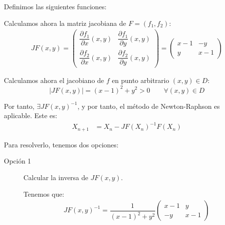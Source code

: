 \begin{ejercicio}
\begin{enumerate}
        Definimos las siguientes funciones:

        Calculamos ahora la matriz jacobiana de $F=(f_1,f_2)$:
        \begin{align*}
            JF(x,y)=\begin{pmatrix}
                \dfrac{\partial f_1}{\partial x}(x,y) & \dfrac{\partial f_1}{\partial y}(x,y)\\
                \dfrac{\partial f_2}{\partial x}(x,y) & \dfrac{\partial f_2}{\partial y}(x,y)
            \end{pmatrix}=\begin{pmatrix}
                x-1 & -y\\
                y & x-1
            \end{pmatrix}
        \end{align*}

        Calculamos ahora el jacobiano de $f$ en punto arbitrario $(x,y)\in D$:
        \begin{equation*}
            |JF(x,y)|=(x-1)^2+y^2>0\qquad \forall (x,y)\in D
        \end{equation*}

        Por tanto, $\exists JF(x,y)^{-1}$, y por tanto, el método de Newton-Raphson es aplicable. Este es:
        \begin{align*}
            X_{n+1}&=X_n-JF(X_n)^{-1}F(X_n)
        \end{align*}

        Para resolverlo, tenemos dos opciones:
        \begin{description}
            \item[Opción 1] Calcular la inversa de $JF(x,y)$.
            
            Tenemos que:
            \begin{align*}
                JF(x,y)^{-1}=\dfrac{1}{(x-1)^2+y^2}\begin{pmatrix}
                    x-1 & y\\
                    -y & x-1
                \end{pmatrix}
            \end{align*}


\end{description}
\end{enumerate}
\end{ejercicio}
